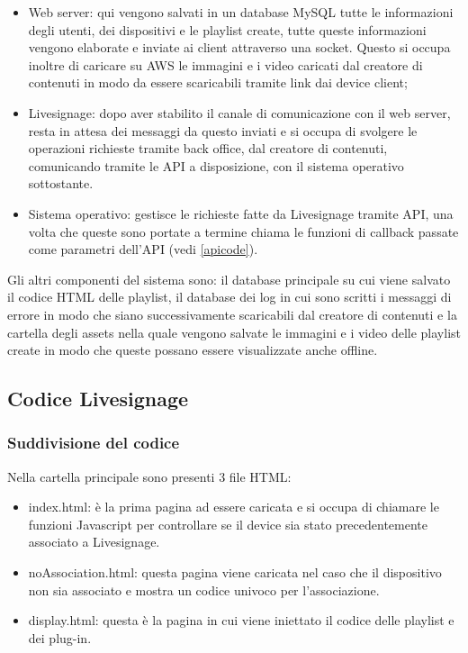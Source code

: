 \begin{itemize}
    \item Web server: qui vengono salvati in un database MySQL tutte le informazioni degli utenti, dei dispositivi e le playlist create, tutte queste informazioni vengono elaborate e inviate ai client attraverso una socket. Questo si occupa inoltre di caricare su AWS le immagini e i video caricati dal creatore di contenuti in modo da essere scaricabili tramite link dai device client;
    \item Livesignage: dopo aver stabilito il canale di comunicazione con il web server, resta in attesa dei messaggi da questo inviati e si occupa di svolgere le operazioni richieste tramite back office, dal creatore di contenuti, comunicando tramite le API a disposizione, con il sistema operativo sottostante.
    \item Sistema operativo: gestisce le richieste fatte da Livesignage tramite API, una volta che queste sono portate a termine chiama le funzioni di callback passate come parametri dell'API (vedi \ref*{apicode}).
\end{itemize}

Gli altri componenti del sistema sono: il database principale su cui viene salvato il codice HTML delle playlist, il database dei log in cui sono scritti i messaggi di errore in modo che siano successivamente scaricabili dal creatore di contenuti e la cartella degli assets nella quale vengono salvate le immagini e i video delle playlist create in modo che queste possano essere visualizzate anche offline.

\subsection{Codice Livesignage}

\subsubsection{Suddivisione del codice}

Nella cartella principale sono presenti 3 file HTML: 
\begin{itemize}
    \item index.html: è la prima pagina ad essere caricata e si occupa di chiamare le funzioni Javascript per controllare se il device sia stato precedentemente associato a Livesignage.
    \item noAssociation.html: questa pagina viene caricata nel caso che il dispositivo non sia associato e mostra un codice univoco per l'associazione.
    \item display.html: questa è la pagina in cui viene iniettato il codice delle playlist e dei plug-in.
\end{itemize}

